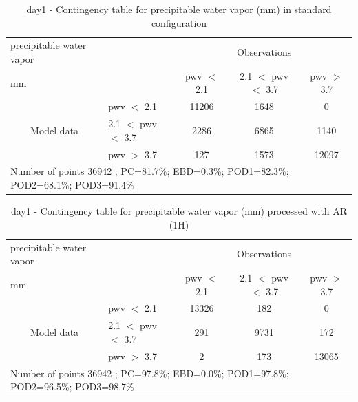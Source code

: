 \begin{table}[p!]
\begin{center}
\begin{tabular}{llccc}
\hline
{precipitable water vapor}                                       &                                                    & \multicolumn{3}{c}{Observations}                 \\
{mm}                                       &                             & pwv $<$ 2.1   & 2.1 $<$ pwv $<$ 3.7 & pwv $>$ 3.7 \\
\hline
\multicolumn{1}{c}{\multirow{3}{*}{Model data}}  & pwv $<$ 2.1             & 11206                & 1648                       & 0              \\
                                                 & 2.1  $<$ pwv $<$ 3.7 & 2286                & 6865                       & 1140              \\
                                                 & pwv $>$ 3.7             & 127                & 1573                       & 12097              \\
\hline
\multicolumn{5}{l}{ Number of points        36942 ; PC=81.7\%; EBD=0.3\%; POD1=82.3\%; POD2=68.1\%; POD3=91.4\%}                 \\
\end{tabular}
\end{center}
\caption{day1 - Contingency table for  precipitable water vapor (mm) in standard configuration  }
\label{tab:contingencypwvBEF:day1}
\end{table}
\begin{table}[p!]
\begin{center}
\begin{tabular}{llccc}
\hline
{precipitable water vapor}                                       &                                                    & \multicolumn{3}{c}{Observations}                 \\
{mm}                                       &                             & pwv $<$ 2.1   & 2.1 $<$ pwv $<$ 3.7 & pwv $>$ 3.7 \\
\hline
\multicolumn{1}{c}{\multirow{3}{*}{Model data}}  & pwv $<$ 2.1             & 13326                & 182                       & 0              \\
                                                 & 2.1  $<$ pwv $<$ 3.7 & 291                & 9731                       & 172              \\
                                                 & pwv $>$ 3.7             & 2                & 173                       & 13065              \\
\hline 
\multicolumn{5}{l}{ Number of points        36942 ; PC=97.8\%; EBD=0.0\%; POD1=97.8\%; POD2=96.5\%; POD3=98.7\%}
\end{tabular}
\end{center}
\caption{day1 - Contingency table for  precipitable water vapor (mm) processed with AR (1H)  }
\label{tab:contingencypwvAFT:day1}
\end{table}

